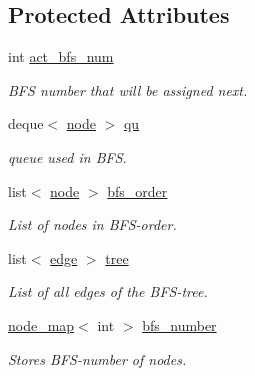 \subsection*{Protected Attributes}
\begin{DoxyCompactItemize}
\item 
\mbox{\label{classbfs_a5a4adad9562896536b8b58ab237e8478}} 
int \mbox{\hyperlink{classbfs_a5a4adad9562896536b8b58ab237e8478}{act\+\_\+bfs\+\_\+num}}
\begin{DoxyCompactList}\small\item\em B\+FS number that will be assigned next. \end{DoxyCompactList}\item 
\mbox{\label{classbfs_aff965242124a7e3a6308de0c0ebfa741}} 
deque$<$ \mbox{\hyperlink{classnode}{node}} $>$ \mbox{\hyperlink{classbfs_aff965242124a7e3a6308de0c0ebfa741}{qu}}
\begin{DoxyCompactList}\small\item\em queue used in B\+FS. \end{DoxyCompactList}\item 
list$<$ \mbox{\hyperlink{classnode}{node}} $>$ \mbox{\hyperlink{classbfs_a35b0acd44887615142fd5f2fc6197452}{bfs\+\_\+order}}
\begin{DoxyCompactList}\small\item\em List of nodes in B\+F\+S-\/order. \end{DoxyCompactList}\item 
list$<$ \mbox{\hyperlink{classedge}{edge}} $>$ \mbox{\hyperlink{classbfs_aa259f09ada9928cda41bcb540f685e80}{tree}}
\begin{DoxyCompactList}\small\item\em List of all edges of the B\+F\+S-\/tree. \end{DoxyCompactList}\item 
\mbox{\label{classbfs_a59d0c5c5ad2715776b20b1aec03dbc3a}} 
\mbox{\hyperlink{classnode__map}{node\+\_\+map}}$<$ int $>$ \mbox{\hyperlink{classbfs_a59d0c5c5ad2715776b20b1aec03dbc3a}{bfs\+\_\+number}}
\begin{DoxyCompactList}\small\item\em Stores B\+F\+S-\/number of nodes. \end{DoxyCompactList}\item 
\mbox{\label{classbfs_ac3db80b59d5db049199936445a6c2da8}} 

\end{DoxyCompactItemize}
